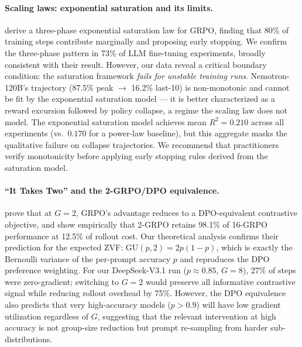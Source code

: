 \documentclass{article}
\begin{document}
\paragraph{Scaling laws: exponential saturation and its limits.}
\citet{nimmaturi2025scalinglaws} derive a three-phase exponential saturation
law for GRPO, finding that 80\% of training steps contribute marginally and
proposing early stopping.
We confirm the three-phase pattern in 73\% of LLM fine-tuning experiments,
broadly consistent with their result.
However, our data reveal a critical boundary condition: the saturation
framework \emph{fails for unstable training runs}.
Nemotron-120B's trajectory (87.5\% peak $\to$ 16.2\% last-10) is
non-monotonic and cannot be fit by the exponential saturation model ---
it is better characterized as a reward excursion followed by policy
collapse, a regime the scaling law does not model.
The exponential saturation model achieves mean $R^{2} = 0.210$ across all
experiments (vs.\ $0.170$ for a power-law baseline), but this aggregate
masks the qualitative failure on collapse trajectories.
We recommend that practitioners verify monotonicity before applying early
stopping rules derived from the saturation model.

\paragraph{``It Takes Two'' and the 2-GRPO/DPO equivalence.}
\citet{wu2025grpo_dpo} prove that at $G = 2$, GRPO's advantage reduces to a
DPO-equivalent contrastive objective, and show empirically that 2-GRPO retains
98.1\% of 16-GRPO performance at 12.5\% of rollout cost.
Our theoretical analysis confirms their prediction for the expected ZVF:
$\mathrm{GU}(p, 2) = 2p(1-p)$, which is exactly the Bernoulli variance of
the per-prompt accuracy $p$ and reproduces the DPO preference weighting.
For our DeepSeek-V3.1 run ($p \approx 0.85$, $G = 8$), 27\% of steps were
zero-gradient; switching to $G = 2$ would preserve all informative contrastive
signal while reducing rollout overhead by 75\%.
However, the DPO equivalence also predicts that very high-accuracy models
($p > 0.9$) will have low gradient utilization regardless of $G$, suggesting
that the relevant intervention at high accuracy is not group-size reduction
but prompt re-sampling from harder sub-distributions.
\end{document}
